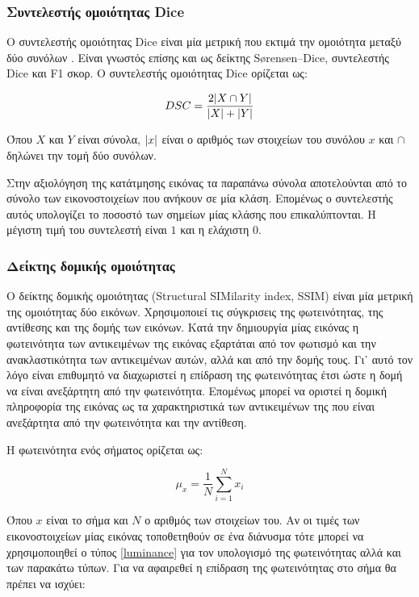 \documentclass[a4paper,12pt]{article}
\DeclarePairedDelimiter\abs{\lvert}{\rvert}
\begin{document}
\subsubsection{Συντελεστής ομοιότητας Dice} \label{Dice:1}

Ο συντελεστής ομοιότητας Dice είναι μία μετρική που εκτιμά την ομοιότητα μεταξύ
δύο συνόλων \cite{dice:1}. Είναι γνωστός επίσης και ως δείκτης Sørensen–Dice,
συντελεστής Dice και F1 σκορ. Ο συντελεστής ομοιότητας Dice ορίζεται ως:

\begin{equation} \label{eq:Dice:1}
    DSC = \frac{2 \abs{X \cap Y}} {\abs{X} + \abs{Y}}
\end{equation}

Όπου $X$ και $Y$ είναι σύνολα, $\abs{x}$ είναι ο αριθμός των στοιχείων του
συνόλου $x$ και $\cap$ δηλώνει την τομή δύο συνόλων.

Στην αξιολόγηση της κατάτμησης εικόνας τα παραπάνω σύνολα αποτελούνται από το
σύνολο των εικονοστοιχείων που ανήκουν σε μία κλάση. Επομένως ο συντελεστής
αυτός υπολογίζει το ποσοστό των σημείων μίας κλάσης που επικαλύπτονται. Η
μέγιστη τιμή του συντελεστή είναι $1$ και η ελάχιστη $0$.

\subsubsection{Δείκτης δομικής ομοιότητας} \label{SSIM:1}

Ο δείκτης δομικής ομοιότητας \cite{SSIM:1} (Structural SIMilarity index, SSIM)
είναι μία μετρική της ομοιότητας δύο εικόνων. Χρησιμοποιεί τις σύγκρισεις της
φωτεινότητας, της αντίθεσης και της δομής των εικόνων. Κατά την δημιουργία μίας
εικόνας η φωτεινότητα των αντικειμένων της εικόνας εξαρτάται από τον φωτισμό και
την ανακλαστικότητα των αντικειμένων αυτών, αλλά και από την δομής τους. Γι᾽
αυτό τον λόγο είναι επιθυμητό να διαχωριστεί η επίδραση της φωτεινότητας έτσι
ώστε η δομή να είναι ανεξάρτητη από την φωτεινότητα. Επομένως μπορεί να οριστεί
η δομική πληροφορία της εικόνας ως τα χαρακτηριστικά των αντικειμένων της που
είναι ανεξάρτητα από την φωτεινότητα και την αντίθεση.

Η φωτεινότητα ενός σήματος ορίζεται ως:

\begin{equation}\label{luminance}
    \mu_x = \frac {1} {N} \sum_{i=1}^{N} x_i
\end{equation}

Όπου $x$ είναι το σήμα  και $N$ ο αριθμός των στοιχείων του. Αν οι τιμές των
εικονοστοιχείων μίας εικόνας τοποθετηθούν σε ένα διάνυσμα τότε μπορεί να
χρησιμοποιηθεί ο τύπος \eqref{luminance} για τον υπολογισμό της φωτεινότητας
αλλά και των παρακάτω τύπων. Για να αφαιρεθεί η επίδραση της φωτεινότητας στο
σήμα θα πρέπει να ισχύει:
\end{document}
